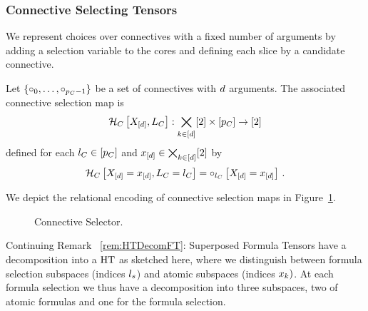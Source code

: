 \subsubsection{Connective Selecting Tensors}

We represent choices over connectives with a fixed number of arguments by adding a selection variable to the cores and defining each slice by a candidate connective.

\begin{definition}\label{def:connectiveSelector}
	Let $\{\circ_{0},\ldots,\circ_{p_{C}-1}\}$ be a set of connectives with $d$ arguments.
	The associated connective selection map is
		\[ \mathcal{H}_{C}\left[X_{[d]},L_{C}\right]
		: \bigtimes_{k\in[d]}[2] \times [p_{C}] \rightarrow [2] \]
	defined for each $l_{C}\in[p_{C}]$ and $x_{[d]}\in\bigtimes_{k\in[d]}[2]$ by 
		\[ \mathcal{H}_{C}\left[X_{[d]}=x_{[d]},L_{C}=l_{C}\right] 
		= \circ_{l_{C}}\left[X_{[d]}=x_{[d]}\right]  \, . \]
\end{definition}

We depict the relational encoding of connective selection maps in Figure~\ref{fig:connectiveSelector}.

\begin{figure}[h]
\begin{center}
	
\end{center}
\caption{Connective Selector.}
\label{fig:connectiveSelector}
\end{figure}


\begin{remark}\label{rem:HTDecomSFT}
	Continuing Remark ~\ref{rem:HTDecomFT}: 
	Superposed Formula Tensors have a decomposition into a $\mathrm{HT}$ as sketched here, where we distinguish between formula selection subspaces (indices $l_{s}$) and atomic subspaces (indices $x_{k})$.
	At each formula selection we thus have a decomposition into three subspaces, two of atomic formulas and one for the formula selection.
\end{remark}




